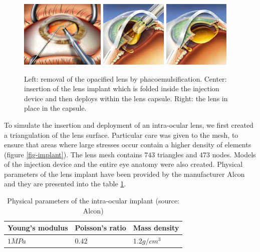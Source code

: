 \documentclass{llncs}
\begin{document}
\begin{figure}[h]
\begin{center}
\includegraphics[height=3.2cm]{images/suction}
\hfill
\includegraphics[height=3.2cm]{images/implant_injection_step_1}
\hfill
\includegraphics[height=3.2cm]{images/implant_injection_step_2}
\caption [Cataract surgery] {Left: removal of the opacified lens by phacoemulsification. Center: insertion of the lens implant which is folded inside the injection device and then deploys within the lens capsule. Right: the lens in place in the capsule.}
\label{fig-surgery}
\end{center}
\end{figure}

To simulate the insertion and deployment of an intra-ocular lens, we first created a triangulation of the lens surface. Particular care was given to the mesh, to ensure that areas where large stresses occur contain a higher density of elements (figure \ref{fig-implant}). The lens mesh contains $743$ triangles and $473$ nodes. Models of the injection device and the entire eye anatomy were also created. Physical parameters of the lens implant have been provided by the manufacturer Alcon and they are presented into the table \ref{tab-parameters}.

\begin{table}[h!]
	\begin{center}
		\begin{tabular}{|p{3cm}|p{3cm}|p{3cm}|}
		\hline
		 \centering Young's modulus & \centering Poisson's ratio & \centering Mass density \tabularnewline
		\hline
		\centering $1 MPa$ & \centering $0.42$ & \centering $1.2 g/cm^3$ \tabularnewline
		\hline
		\end{tabular}
	\vspace{0.3cm}
	\caption{Physical parameters of the intra-ocular implant (source: Alcon)}
	\label{tab-parameters}
	\end{center}
\end{table}
\end{document}
